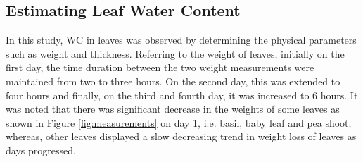 \documentclass[preprints,article,accept,moreauthors,pdftex]{Definitions/mdpi}
\renewcommand{\^}{\hat}  %
\begin{document}
\subsection{{Estimating Leaf Water Content}}
In this study, WC in leaves was observed by determining the physical parameters such as weight and thickness. Referring to the weight of leaves, initially on the first day, the time duration between the two weight measurements were maintained from two to three hours. On the second day, this was extended to four hours and finally, on the third and fourth day, it was increased to 6 hours. It was noted that there was significant {decrease} in the weights of some leaves as shown in Figure \ref{fig:measurements} on day 1, i.e. basil, baby leaf and pea shoot, whereas, other leaves displayed a slow decreasing trend in weight loss of leaves as days progressed.
\end{document}
